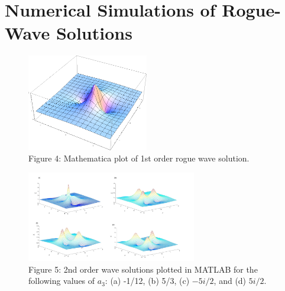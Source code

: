 \documentclass{beamer}
\def\e{\end}
\theoremstyle{plain}
\theoremstyle{definition}
\begin{document}


\section{Numerical Simulations of Rogue-Wave Solutions}

\frame
{
\begin{figure}[h]
\begin{center}
\includegraphics[width=200px]{1st_order.png}\\
Figure 4: Mathematica plot of 1st order rogue wave solution.
\end{center}
\end{figure}
\vspace{-1mm}
}

\frame
{
\begin{figure}
\begin{center}
\includegraphics[width=280px]{figure1_new.jpg}\\
Figure 5: 2nd order wave solutions plotted in MATLAB for the following values of $a_3$: (a) -1/12, (b) 5/3, (c) $-5i/2$, and (d) $5i/2$.
\end{center}
\end{figure}
}
\end{document}
